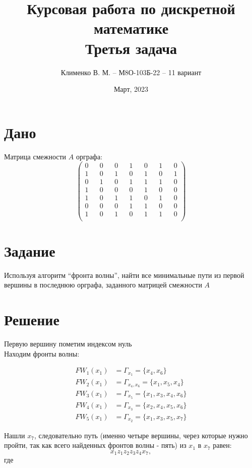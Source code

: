 \documentclass{article}
\title{Курсовая работа по дискретной математике\\Третья задача}
\author{Клименко В. М. -- М8О-103Б-22 -- 11 вариант}
\date{Март, 2023}
\begin{document}
\maketitle


\section*{Дано}
Матрица смежности $A$ орграфа:
$$
\begin{pmatrix}
    0 && 0 && 0 && 1 && 0 && 1 && 0 \\
    1 && 0 && 1 && 0 && 1 && 0 && 1 \\
    0 && 1 && 0 && 1 && 1 && 1 && 0 \\
    1 && 0 && 0 && 0 && 1 && 0 && 0 \\
    1 && 0 && 1 && 1 && 0 && 1 && 0 \\
    0 && 0 && 0 && 1 && 1 && 0 && 0 \\
    1 && 0 && 1 && 0 && 1 && 1 && 0 \\
\end{pmatrix}
$$


\section*{Задание}
Используя алгоритм “фронта волны”, найти все минимальные
пути из первой вершины в последнюю орграфа, заданного матрицей
смежности $A$


\section*{Решение}
Первую вершину пометим индексом нуль
\\
Находим фронты волны:

\begin{align}
    FW_1(x_1) &= \Gamma_{x_1} = \{x_4, x_6\} \\
    FW_2(x_1) &= \Gamma_{x_4, x_6} = \{x_1, x_5, x_4\} \\
    FW_3(x_1) &= \Gamma_{x_5} = \{x_1, x_3, x_4, x_6\} \\
    FW_4(x_1) &= \Gamma_{x_3} = \{x_2, x_4, x_5, x_6\} \\
    FW_5(x_1) &= \Gamma_{x_2} = \{x_1, x_3, x_5, x_7\}
\end{align}

Нашли $x_7$, следовательно путь (именно четыре вершины, через которые нужно пройти,
так как всего найденных фронтов волны - пять) из $x_1$ в $x_7$ равен:
$$
x_1z_1z_2z_3z_4x_7,
$$
где
\end{document}
